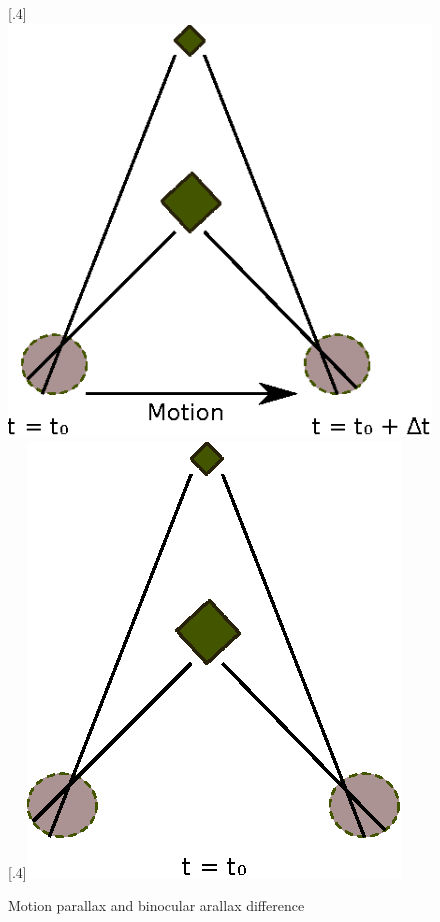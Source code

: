 \begin{figure}[!h]
\centering
{}
[.4\linewidth]{\includegraphics{Mparallax}}%
[.4\linewidth]{\includegraphics{Bparallax}}%
\caption{Motion parallax and binocular arallax difference}
\label{fig:parallax}
\end{figure}

%
%

